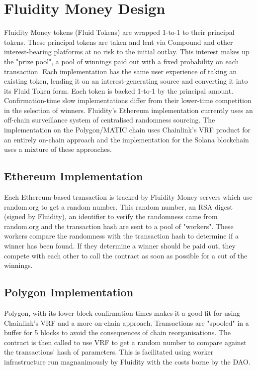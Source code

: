 
\section{Fluidity Money Design}

Fluidity Money tokens (Fluid Tokens) are wrapped 1-to-1 to their principal tokens. These principal tokens are taken and lent via Compound and other interest-bearing platforms at no risk to the initial outlay. This interest makes up the "prize pool", a pool of winnings paid out with a fixed probability on each transaction.
Each implementation has the same user experience of taking an existing token, lending it on an interest-generating source and converting it into its Fluid Token form. Each token is backed 1-to-1 by the principal amount. Confirmation-time slow implementations differ from their lower-time competition in the selection of winners. Fluidity's Ethereum implementation currently uses an off-chain surveillance system of centralised randomness sourcing. The implementation on the Polygon/MATIC chain uses Chainlink's VRF product for an entirely on-chain approach and the implementation for the Solana blockchain uses a mixture of these approaches.

\subsection{Ethereum Implementation}

Each Ethereum-based transaction is tracked by Fluidity Money servers which use random.org to get a random number. This random number, an RSA digest (signed by Fluidity), an identifier to verify the randomness came from random.org and the transaction hash are sent to a pool of "workers". These workers compare the randomness with the transaction hash to determine if a winner has been found. If they determine a winner should be paid out, they compete with each other to call the contract as soon as possible for a cut of the winnings.

\subsection{Polygon Implementation}

Polygon, with its lower block confirmation times makes it a good fit for using Chainlink's VRF and a more on-chain approach. Transactions are "spooled" in a buffer for 5 blocks to avoid the consequences of chain reorganisations. The contract is then called to use VRF to get a random number to compare against the transactions' hash of parameters. This is facilitated using worker infrastructure run magnanimously by Fluidity with the costs borne by the DAO.

